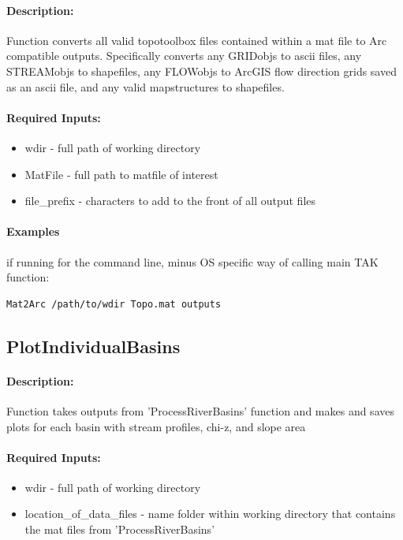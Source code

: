 \paragraph{Description:}
Function converts all valid topotoolbox files contained within a mat file
to Arc compatible outputs. Specifically converts any GRIDobjs to
ascii files, any STREAMobjs to shapefiles, any FLOWobjs to ArcGIS 
flow direction grids saved as an ascii file, and any valid mapstructures
to shapefiles.

\paragraph{Required Inputs:}
\begin{itemize}
\item wdir - full path of working directory
\item MatFile - full path to matfile of interest
\item file\_prefix - characters to add to the front of all output files
\end{itemize}

\paragraph{Examples} if running for the command line, minus OS specific way of calling main TAK function:
\begin{lstlisting}[language=bash]
Mat2Arc /path/to/wdir Topo.mat outputs
\end{lstlisting}

\subsection{PlotIndividualBasins}
\paragraph{Description:}
Function takes outputs from 'ProcessRiverBasins' function and makes and saves plots for each basin with stream profiles, chi-z, and slope area

\paragraph{Required Inputs:}
\begin{itemize}
\item wdir - full path of working directory
\item location\_of\_data\_files - name folder within working directory that contains the mat files from 'ProcessRiverBasins'
\end{itemize}

